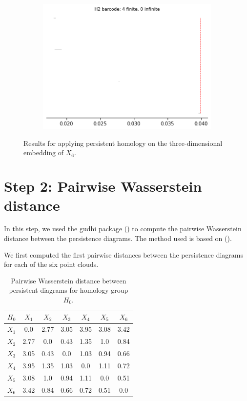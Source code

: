 \begin{figure}[H]
\begin{subfigure}[b]{0.24\textwidth}
\includegraphics[width=\textwidth]{figures/topology/X6_H2_barcode.png}
 \caption{}
\end{subfigure}
\caption{Results for applying persistent homology on the three-dimensional embedding of $X_6$.}
\end{figure}

\section{Step 2: Pairwise Wasserstein distance}
In this step, we used the gudhi package (\cite{gudhi:urm}) to compute the pairwise Wasserstein distance between the persistence diagrams. The method used is based on (\cite{kerber_geometry_2016}). 

We first computed the first pairwise distances between the persistence diagrams for each of the six point clouds. 

\begin{table}[!htbp]
        \centering
        \small
        \setlength\tabcolsep{5pt}
        \begin{tabular}{|c|c|c|c|c|c|c|}
\hline
 $H_0$& $X_1$ & $X_2$ & $X_3$ & $X_4$ & $X_5$ & $X_6$\\
 \hline
$X_1$ &
0.0&
2.77&
3.05&
3.95&
3.08&
3.42
\\
\hline
$X_2$ &
2.77&
0.0&
0.43&
1.35&
1.0&
0.84
\\
\hline
$X_3$ &
3.05&
0.43&
0.0&
1.03&
0.94&
0.66
\\
\hline
$X_4$ &
3.95&
1.35&
1.03&
0.0&
1.11&
0.72
\\
\hline
$X_5$ &
3.08&
1.0&
0.94&
1.11&
0.0&
0.51
\\
\hline
$X_6$ &
3.42&
0.84&
0.66&
0.72&
0.51&
0.0
\\
\hline
\end{tabular}
\caption{Pairwise Wasserstein distance between persistent diagrams for homology group $H_0$.}
\label{tab:Wass_H0}
\end{table}

